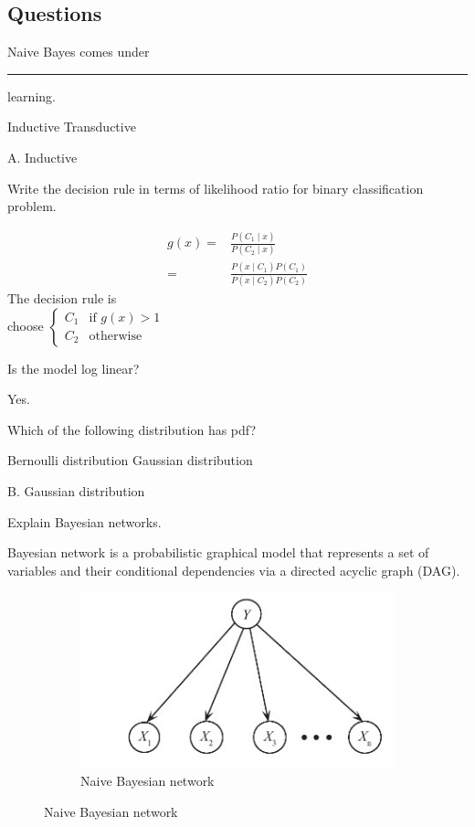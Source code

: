\documentclass[12pt,letterpaper, onecolumn]{exam}
\begin{document}
\subsection*{Questions}
\begin{questions}
\question[] Naive Bayes comes under \rule{2.5cm}{0.15mm} learning.
\begin{choices}
\choice Inductive
\choice Transductive
\end{choices}
\begin{Solution}
A. Inductive
\end{Solution}
\question[] Write the decision rule in terms of likelihood ratio for binary classification problem.
\begin{Solution}
\begin{align*}
g(x) ={}& \frac{P(C_1 \mid x)}{
P(C_2 \mid x) }\\
={}& 
\frac{P(x \mid C_1)P(C_1)}{P(x \mid C_2)P(C_2)}
\end{align*}
The decision rule is\\
choose $\begin{cases}
        C_1 & \text{if } g(x) > 1\\
        C_2 & \text{otherwise } 
    \end{cases}$



\end{Solution}
\question[] Is the model log linear?\\
\begin{Solution}
Yes.
\end{Solution}

\question[] Which of the following distribution has pdf?
\begin{choices}
\choice Bernoulli distribution
\choice Gaussian distribution
\end{choices}
\begin{Solution}
B. Gaussian distribution
\end{Solution}

\question[] Explain Bayesian networks.\\
\begin{Solution}
Bayesian network is a probabilistic graphical model that represents a set of variables and their conditional dependencies via a directed acyclic graph (DAG).
\begin{figure}[!h]
\centering
\begin{subfigure}{.5\textwidth}
  \centering
  \includegraphics[width=.4\linewidth]{../images/Naive_bayes}
  \caption{Naive Bayesian network}


\end{subfigure}
\end{figure}
\end{Solution}
\end{questions}
\end{document}

